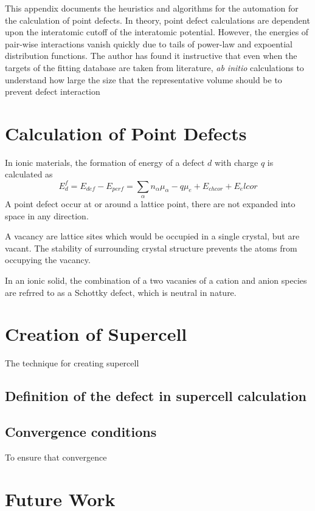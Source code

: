 
This appendix documents the heuristics and algorithms for the automation for the calculation of point defects.
In theory, point defect calculations are dependent upon the interatomic cutoff of the interatomic potential.
However, the energies of pair-wise interactions vanish quickly due to tails of power-law and expoential distribution functions.
The author has found it instructive that even when the targets of the fitting database are taken from literature, \emph{ab initio} calculations to understand how large the size that the representative volume should be to prevent defect interaction
\section{Calculation of Point Defects}
In ionic materials, the formation of energy of a defect $d$ with charge $q$ is calculated as
\begin{equation}
  E_d^f=E_{def}-E_{perf}=\sum_\alpha n_\alpha \mu_\alpha - q\mu_e + E_{chcor} + E_elcor
\end{equation}
A point defect occur at or around a lattice point, there are not expanded into space in any direction.

A vacancy are lattice sites which would be occupied in a single crystal, but are vacant.  The stability of surrounding crystal structure prevents the atoms from occupying the vacancy.

In an ionic solid, the combination of a two vacanies of a cation and anion species are refrred to as a Schottky defect, which is neutral in nature.


\section{Creation of Supercell}
The technique for creating supercell
\subsection{Definition of the defect in supercell calculation}

\subsection{Convergence conditions}
To ensure that convergence
\section{Future Work}

